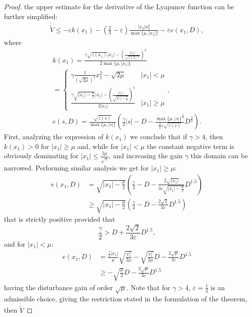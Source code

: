 \documentclass[10pt,a4paper]{amsart}
\begin{document}
\begin{proof}
the upper estimate for the derivative of the Lyapunov function can
be further simplified:
\begin{gather*}
\dot{\tilde{V}}\leq-\varepsilon k(x_{1})-\left(\frac{2}{3}-\varepsilon\right)\frac{|x_{2}|x_{2}^{2}}{\max\{\mu,|x_{1}|\}} -\varepsilon e(x_{1},D),
\end{gather*}
where
\begin{gather*}
k(x_{1})=\frac{\gamma\sqrt{z(x_{1})}|x_{1}|-\left(\frac{|x_{1}|}{\sqrt{z(x_{1})}}\right)^{3}}{2\max\{\mu,|x_{1}|\}}\\
=\begin{cases}
\gamma\frac{1}{\left(\sqrt{2\mu}\right)^{3}}x_{1}^{2}-\sqrt{2\mu} & |x_{1}|<\mu\\
\frac{\gamma\sqrt{|x_{1}|-\frac{\mu}{2}}|x_{1}|-\left(\frac{|x_{1}|}{\sqrt{|x_{1}|-\frac{\mu}{2}}}\right)^{3}}{2|x_{1}|} & |x_{1}|\geq\mu
\end{cases},\\
e(s,D)=\frac{\sqrt{z(s)}}{\max\{\mu,|s|\}}\left(\frac{\gamma}{2}|s|-D-\frac{\max\{\mu,|s|\}^{\frac{3}{2}}}{\frac{3}{2}\varepsilon\sqrt{z(s)}}D^{\frac{3}{2}}\right).
\end{gather*}
First, analyzing the expression of $k(x_{1})$ we conclude that if
$\gamma>4$, then $k(x_{1})>0$ for $|x_{1}|\geq\mu$ and, while for
$|x_{1}|<\mu$ the constant negative term is obviously dominating
for $|x_{1}|\leq\frac{2\mu}{\sqrt{\gamma}}$, and increasing the gain
$\gamma$ this domain can be narrowed. Performing similar analysis
we get for $|x_{1}|\geq\mu$:
\begin{align*}
e(x_{1},D) & =\sqrt{|x_{1}|-\frac{\mu}{2}}\left(\frac{\gamma}{2}-D-\frac{2\sqrt{|x_{1}|}}{3\varepsilon\sqrt{|x_{1}|-\frac{\mu}{2}}}D^{1.5}\right)\\
 & \geq\sqrt{|x_{1}|-\frac{\mu}{2}}\left(\frac{\gamma}{2}-D-\frac{2\sqrt{2}}{3\varepsilon}D^{1.5}\right)
\end{align*}
that is strictly positive provided that 
\[
\frac{\gamma}{2}>D+\frac{2\sqrt{2}}{3\varepsilon}D^{1.5},
\]
and for $|x_{1}|<\mu$:
\begin{align*}
e(x_{1},D) & =\frac{\frac{\gamma}{2}|x_{1}|}{\mu}\sqrt{\frac{x_{1}^{2}}{2\mu}}-\sqrt{\frac{x_{1}^{2}}{2\mu}}D-\frac{2\sqrt{\mu}}{3\varepsilon}D^{1.5}\\
 & \geq-\sqrt{\frac{\mu}{2}}D-\frac{2\sqrt{\mu}}{3\varepsilon}D^{1.5}
\end{align*}
having the disturbance gain of order $\sqrt{\mu}$. Note that for
$\gamma>4$, $\varepsilon=\frac{1}{3}$ is an admissible choice, giving
the restriction stated in the formulation of the theorem, then $\dot{\tilde{V}}$

\end{proof}
\end{document}
